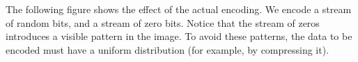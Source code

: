 
The following figure shows the effect of the actual encoding.  We encode a
stream of random bits, and a stream of zero bits.  Notice that the stream of
zeros introduces a visible pattern in the image.  To avoid these patterns,
the data to be encoded must have a uniform distribution (for example, by
compressing it).


